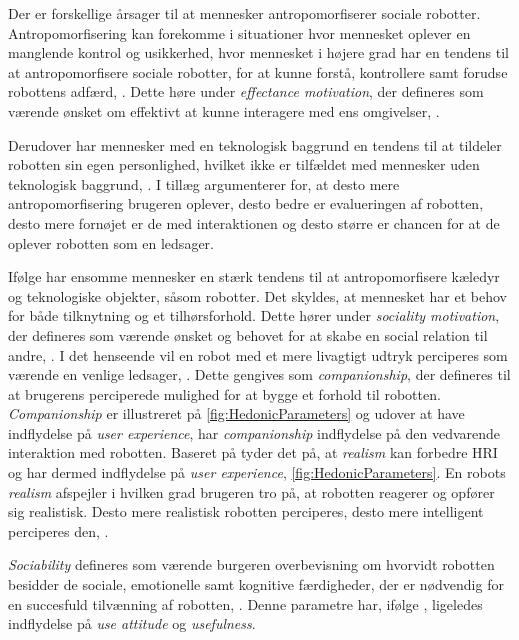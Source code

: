 Der er forskellige årsager til at mennesker antropomorfiserer sociale robotter. Antropomorfisering kan forekomme i situationer hvor mennesket oplever en manglende kontrol og usikkerhed, hvor mennesket i højere grad har en tendens til at antropomorfisere sociale robotter, for at kunne forstå, kontrollere samt forudse robottens adfærd, \parencite[s. 1478]{PDF:ExploringInfluencingVariable}. Dette høre under \textit{effectance motivation}, der defineres som værende ønsket om effektivt at kunne interagere med ens omgivelser, \parencite[s. 62]{PDF:EffectsOfAnticipatedHRI}.

Derudover har mennesker med en teknologisk baggrund en tendens til at tildeler robotten sin egen personlighed, hvilket ikke er tilfældet med mennesker uden teknologisk baggrund, \parencite[s. 19]{PDF:CloseButNotStuck}. I tillæg argumenterer \textcite[s. 2]{PDF:SharingALifeHarvey} for, at desto mere antropomorfisering brugeren oplever, desto bedre er evalueringen af robotten, desto mere fornøjet er de med interaktionen og desto større er chancen for at de oplever robotten som en ledsager.

Ifølge \textcite[s. 61]{PDF:EffectsOfAnticipatedHRI} har ensomme mennesker en stærk tendens til at antropomorfisere kæledyr og teknologiske objekter, såsom robotter. Det skyldes, at mennesket har et behov for både tilknytning og et tilhørsforhold. Dette hører under \textit{sociality motivation}, der defineres som værende ønsket og behovet for at skabe en social relation til andre, \parencite[s. 61]{PDF:EffectsOfAnticipatedHRI}. I det henseende vil en robot med et mere livagtigt udtryk perciperes som værende en venlige ledsager, \parencite[s. 1478]{PDF:ExploringInfluencingVariable}. Dette gengives som \textit{companionship}, der defineres til at brugerens perciperede mulighed for at bygge et forhold til robotten. \textit{Companionship} er illustreret på \autoref{fig:HedonicParameters} og udover at have indflydelse på \textit{user experience}, har \textit{companionship} indflydelse på den vedvarende interaktion med robotten. \blankline
%
Baseret på \textcite[s. 1478]{PDF:ExploringInfluencingVariable} tyder det på, at \textit{realism} kan forbedre HRI og har dermed indflydelse på \textit{user experience}, \autoref{fig:HedonicParameters}. En robots \textit{realism} afspejler i hvilken grad brugeren tro på, at robotten reagerer og opfører sig realistisk. Desto mere realistisk robotten perciperes, desto mere intelligent perciperes den, \parencite[s. 1478]{PDF:ExploringInfluencingVariable}. 

\textit{Sociability} defineres som værende burgeren overbevisning om hvorvidt robotten besidder de sociale, emotionelle samt kognitive færdigheder, der er nødvendig for en succesfuld tilvænning af robotten, \parencite[s. 1478]{PDF:ExploringInfluencingVariable}. Denne parametre har, ifølge \textcite[s. 1478]{PDF:ExploringInfluencingVariable}, ligeledes indflydelse på \textit{use attitude} og \textit{usefulness}.
%
